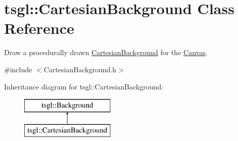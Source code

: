 \hypertarget{classtsgl_1_1_cartesian_background}{}\section{tsgl\+:\+:Cartesian\+Background Class Reference}
\label{classtsgl_1_1_cartesian_background}


Draw a procedurally drawn \hyperlink{classtsgl_1_1_cartesian_background}{Cartesian\+Background} for the \hyperlink{classtsgl_1_1_canvas}{Canvas}.  




{\ttfamily \#include $<$Cartesian\+Background.\+h$>$}

Inheritance diagram for tsgl\+:\+:Cartesian\+Background\+:\begin{figure}[H]
\begin{center}
\leavevmode
\includegraphics[height=2.000000cm]{classtsgl_1_1_cartesian_background}
\end{center}
\end{figure}
